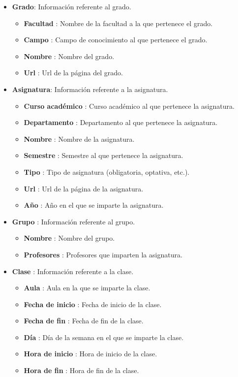 \begin{itemize}
    \item \textbf{Grado}: Información referente al grado.
    \begin{itemize}
        \item \textbf{Facultad} : Nombre de la facultad a la que pertenece el grado.
        \item \textbf{Campo} : Campo de conocimiento al que pertenece el grado.
        \item \textbf{Nombre} : Nombre del grado.
        \item \textbf{Url} : Url de la página del grado.
    \end{itemize}

    \item \textbf{Asignatura}: Información referente a la asignatura.
    \begin{itemize}
        \item \textbf{Curso académico} : Curso académico al que pertenece la asignatura.
        \item \textbf{Departamento} : Departamento al que pertenece la asignatura.
        \item \textbf{Nombre} : Nombre de la asignatura.
        \item \textbf{Semestre} : Semestre al que pertenece la asignatura.
        \item \textbf{Tipo} : Tipo de asignatura (obligatoria, optativa, etc.).
        \item \textbf{Url} : Url de la página de la asignatura.
        \item \textbf{Año} : Año en el que se imparte la asignatura.
    \end{itemize}

    \item \textbf{Grupo} : Información referente al grupo.
    \begin{itemize}
        \item \textbf{Nombre} : Nombre del grupo.
        \item \textbf{Profesores} : Profesores que imparten la asignatura.
    \end{itemize}

    \item \textbf{Clase} : Información referente a la clase.
    \begin{itemize}
        \item \textbf{Aula} : Aula en la que se imparte la clase.
        \item \textbf{Fecha de inicio} : Fecha de inicio de la clase.
        \item \textbf{Fecha de fin} : Fecha de fin de la clase.
        \item \textbf{Día} : Día de la semana en el que se imparte la clase.
        \item \textbf{Hora de inicio} : Hora de inicio de la clase.
        \item \textbf{Hora de fin} : Hora de fin de la clase.
    \end{itemize}
\end{itemize}

